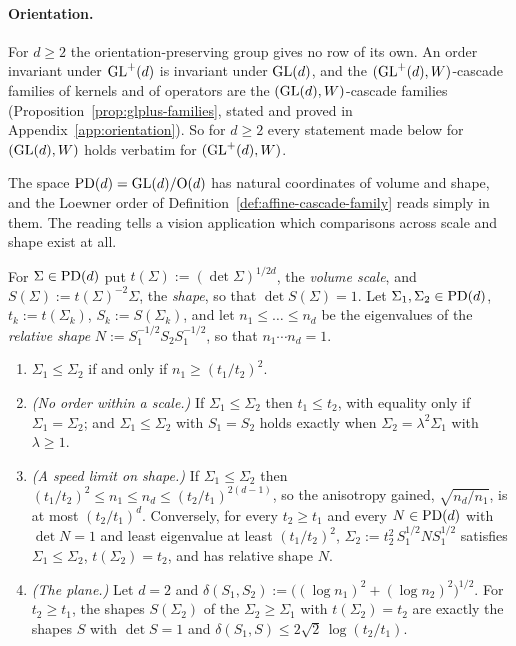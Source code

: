 \paragraph{Orientation.} For $d \ge 2$ the orientation-preserving group gives no row of its own. An
order invariant under $\mathrm{GL}^+(d)$ is invariant under $\mathrm{GL}(d)$, and the $(\mathrm{GL}^+(d), W)$-cascade families
of kernels and of operators are the $(\mathrm{GL}(d), W)$-cascade families
(Proposition~\ref{prop:glplus-families}, stated and proved in Appendix~\ref{app:orientation}). So for
$d \ge 2$ every statement made below for $(\mathrm{GL}(d), W)$ holds verbatim for $(\mathrm{GL}^+(d), W)$.

The space $\mathrm{PD}(d) = \mathrm{GL}(d)/\mathrm{O}(d)$ has natural coordinates of volume and shape, and the Loewner
order of Definition~\ref{def:affine-cascade-family} reads simply in them. The reading tells a vision
application which comparisons across scale and shape exist at all.

\begin{lemma}\label{lem:loewner-scale-shape}
For $\Sigma \in \mathrm{PD}(d)$ put $t(\Sigma) := (\det\Sigma)^{1/2d}$, the \emph{volume scale}, and
$S(\Sigma) := t(\Sigma)^{-2}\Sigma$, the \emph{shape}, so that $\det S(\Sigma) = 1$. Let
$\Sigma_1, \Sigma_2 \in \mathrm{PD}(d)$, $t_k := t(\Sigma_k)$, $S_k := S(\Sigma_k)$, and let
$n_1 \le \dots \le n_d$ be the eigenvalues of the \emph{relative shape}
$N := S_1^{-1/2}S_2S_1^{-1/2}$, so that $n_1 \cdots n_d = 1$.
\begin{enumerate}
\item $\Sigma_1 \le \Sigma_2$ if and only if $n_1 \ge (t_1/t_2)^2$.
\item \emph{(No order within a scale.)} If $\Sigma_1 \le \Sigma_2$ then $t_1 \le t_2$, with
equality only if $\Sigma_1 = \Sigma_2$; and $\Sigma_1 \le \Sigma_2$ with $S_1 = S_2$ holds exactly
when $\Sigma_2 = \lambda^2\Sigma_1$ with $\lambda \ge 1$.
\item \emph{(A speed limit on shape.)} If $\Sigma_1 \le \Sigma_2$ then
$(t_1/t_2)^2 \le n_1 \le n_d \le (t_2/t_1)^{2(d-1)}$, so the anisotropy gained,
$\sqrt{n_d/n_1}$, is at most $(t_2/t_1)^d$. Conversely, for every $t_2 \ge t_1$ and every
$N \in \mathrm{PD}(d)$ with $\det N = 1$ and least eigenvalue at least $(t_1/t_2)^2$,
$\Sigma_2 := t_2^2\,S_1^{1/2}NS_1^{1/2}$ satisfies $\Sigma_1 \le \Sigma_2$, $t(\Sigma_2) = t_2$, and
has relative shape $N$.
\item \emph{(The plane.)} Let $d = 2$ and
$\delta(S_1,S_2) := \bigl((\log n_1)^2 + (\log n_2)^2\bigr)^{1/2}$. For $t_2 \ge t_1$, the shapes
$S(\Sigma_2)$ of the $\Sigma_2 \ge \Sigma_1$ with $t(\Sigma_2) = t_2$ are exactly the shapes $S$
with $\det S = 1$ and $\delta(S_1,S) \le 2\sqrt2\,\log(t_2/t_1)$.
\end{enumerate}
\end{lemma}

